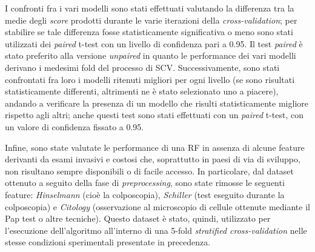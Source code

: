 I confronti fra i vari modelli sono stati effettuati valutando la differenza tra la medie degli \textit{score} prodotti durante le varie iterazioni della \textit{cross-validation}; per stabilire se tale differenza fosse statisticamente significativa o meno sono stati utilizzati dei \textit{paired} t-test con un livello di confidenza pari a 0.95. Il test \textit{paired} è stato preferito alla versione \textit{unpaired} in quanto le performance dei vari modelli derivano i medesimi fold del processo di SCV.
Successivamente, sono stati confrontati fra loro i modelli ritenuti migliori per ogni livello (se sono risultati statisticamente differenti, altrimenti ne è stato selezionato uno a piacere), andando a verificare la presenza di un modello che risulti statisticamente migliore rispetto agli altri; anche questi test sono stati effettuati con un \textit{paired} t-test, con un valore di confidenza fissato a 0.95.

Infine, sono state valutate le performance di una RF in assenza di alcune feature derivanti da esami invasivi e costosi che, soprattutto in paesi di via di sviluppo, non risultano sempre disponibili o di facile accesso.
In particolare, dal dataset ottenuto a seguito della fase di \textit{preprocessing}, sono state rimosse le seguenti feature: \textit{Hinselmann} (cioè la colposcopia), \textit{Schiller} (test eseguito durante la colposcopia) e \textit{Citology} (osservazione al microscopio di cellule ottenute mediante il Pap test o altre tecniche).
Questo dataset è stato, quindi, utilizzato per l'esecuzione dell'algoritmo all'interno di una 5-fold \textit{stratified cross-validation} nelle stesse condizioni sperimentali presentate in precedenza.